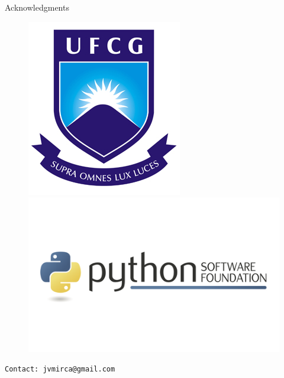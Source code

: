 \documentclass[aspectratio=169]{beamer}
\begin{document}
\begin{frame}[plain]{Acknowledgments}
\begin{center}
\begin{figure}[H]
\begin{minipage}[h]{.3\linewidth}
\includegraphics[scale=0.6]{images/logoufcg.jpg}
\end{minipage}
\begin{minipage}[h]{.4\linewidth}
\includegraphics[scale=0.35]{images/psf.png} 
\end{minipage}
\end{figure}
\end{center}
    \texttt{Contact: jvmirca@gmail.com}
\end{frame}
\end{document}
